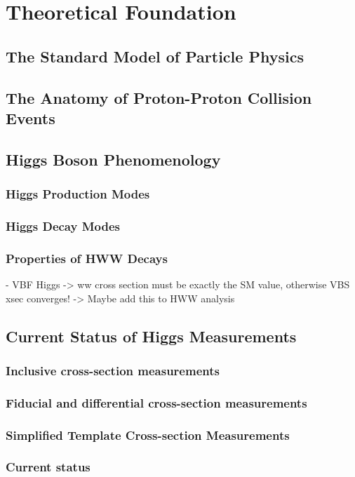 \chapter{Theoretical Foundation}
\label{chap:theory}

\section{The Standard Model of Particle Physics}
\label{sec:sm}


\section{The Anatomy of Proton-Proton Collision Events}
\label{sec:anatomy}




\section{Higgs Boson Phenomenology}

\subsection{Higgs Production Modes}
\subsection{Higgs Decay Modes}
\subsection{Properties of HWW Decays}
- VBF Higgs -> ww cross section must be exactly the SM value, otherwise VBS xsec converges!
-> Maybe add this to HWW analysis

\section{Current Status of Higgs Measurements}

\subsection{Inclusive cross-section measurements}
\subsection{Fiducial and differential cross-section measurements}
\subsection{Simplified Template Cross-section Measurements}
\subsection{Current status}

